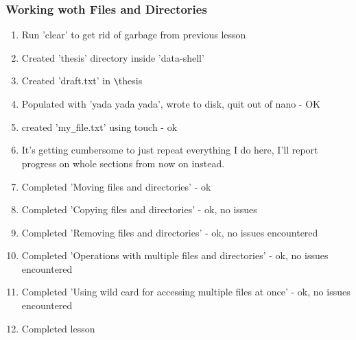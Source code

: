 \documentclass{article}
\begin{document}
\subsubsection{Working woth Files and Directories}
\begin{enumerate}
    \item Run 'clear' to get rid of garbage from previous lesson
    \item Created 'thesis' directory inside 'data-shell'
    \item Created 'draft.txt' in \verb|\|thesis
    \item Populated with 'yada yada yada', wrote to disk, quit out of nano - OK
    \item created 'my\verb|_|file.txt' using touch - ok
    \item It's getting cumbersome to just repeat everything I do here, I'll report progress on whole sections from now on instead.
    \item Completed 'Moving files and directories' - ok
    \item Completed 'Copying files and directories' - ok, no issues
    \item Completed 'Removing files and directories' - ok, no issues encountered
    \item Completed 'Operations with multiple files and directories' - ok, no issues encountered
    \item Completed 'Using wild card for accessing multiple files at once' - ok, no issues encountered
    \item Completed lesson
\end{enumerate}
\end{document}
